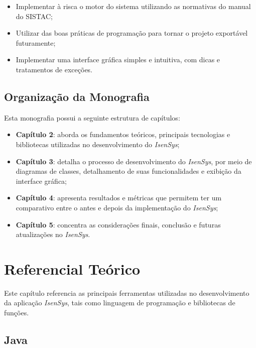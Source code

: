 \documentclass[
	12pt,			%
	openright,		%
	oneside,	
	a4paper,		%
	english,		%
	brazil			%
]{abntex2/abntex2}  %
\begin{document}
		\begin{itemize}
			
			\item Implementar à risca o motor do sistema utilizando as normativas do manual do SISTAC;
			\item Utilizar das boas práticas de programação para tornar o projeto exportável futuramente;
			\item Implementar uma interface gráfica simples e intuitiva, com dicas e tratamentos de exceções.
			
		\end{itemize}
		
	\section{Organização da Monografia}
	
		Esta monografia possui a seguinte estrutura de capítulos:
		
		\begin{itemize}
			
			\item \textbf{Capítulo 2}: aborda os fundamentos teóricos, principais tecnologias e bibliotecas utilizadas no desenvolvimento do \textit{IsenSys};
			\item \textbf{Capítulo 3}: detalha o processo de desenvolvimento do \textit{IsenSys}, por meio de diagramas de classes, detalhamento de suas funcionalidades e exibição da interface gráfica;
			\item \textbf{Capítulo 4}: apresenta resultados e métricas que permitem ter um comparativo entre o antes e depois da implementação do \textit{IsenSys};
			\item \textbf{Capítulo 5}: concentra as considerações finais, conclusão e futuras atualizações no \textit{IsenSys}.
			
		\end{itemize}

\chapter{Referencial Teórico}

	Este capítulo referencia as principais ferramentas utilizadas no desenvolvimento da aplicação \textit{IsenSys}, tais como linguagem de programação e bibliotecas de funções.
	
	\section{Java}
	
\end{document}
